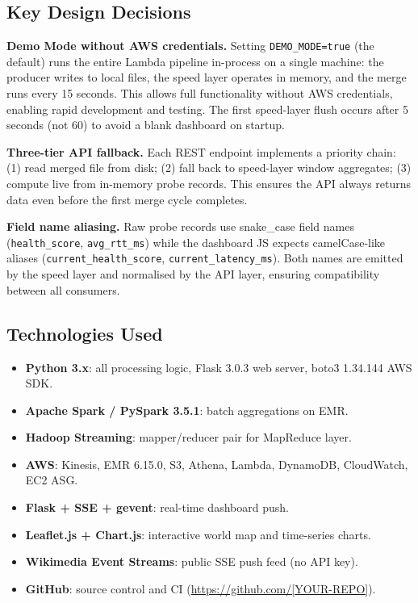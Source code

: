 \documentclass[conference]{IEEEtran}
\begin{document}
\subsection{Key Design Decisions}

\textbf{Demo Mode without AWS credentials.}
Setting \texttt{DEMO\_MODE=true} (the default) runs the entire Lambda pipeline
in-process on a single machine: the producer writes to local files, the speed
layer operates in memory, and the merge runs every 15 seconds. This allows
full functionality without AWS credentials, enabling rapid development and
testing. The first speed-layer flush occurs after 5 seconds (not 60) to avoid
a blank dashboard on startup.

\textbf{Three-tier API fallback.}
Each REST endpoint implements a priority chain: (1) read merged file from disk;
(2) fall back to speed-layer window aggregates; (3) compute live from in-memory
probe records. This ensures the API always returns data even before the first
merge cycle completes.

\textbf{Field name aliasing.}
Raw probe records use snake\_case field names (\texttt{health\_score},
\texttt{avg\_rtt\_ms}) while the dashboard JS expects camelCase-like aliases
(\texttt{current\_health\_score}, \texttt{current\_latency\_ms}). Both names
are emitted by the speed layer and normalised by the API layer, ensuring
compatibility between all consumers.

\subsection{Technologies Used}

\begin{itemize}
  \item \textbf{Python 3.x}: all processing logic, Flask 3.0.3 web server,
    boto3 1.34.144 AWS SDK.
  \item \textbf{Apache Spark / PySpark 3.5.1}: batch aggregations on EMR.
  \item \textbf{Hadoop Streaming}: mapper/reducer pair for MapReduce layer.
  \item \textbf{AWS}: Kinesis, EMR 6.15.0, S3, Athena, Lambda, DynamoDB,
    CloudWatch, EC2 ASG.
  \item \textbf{Flask + SSE + gevent}: real-time dashboard push.
  \item \textbf{Leaflet.js + Chart.js}: interactive world map and time-series
    charts.
  \item \textbf{Wikimedia Event Streams}: public SSE push feed (no API key).
  \item \textbf{GitHub}: source control and CI (\url{https://github.com/[YOUR-REPO]}).
\end{itemize}
\end{document}
